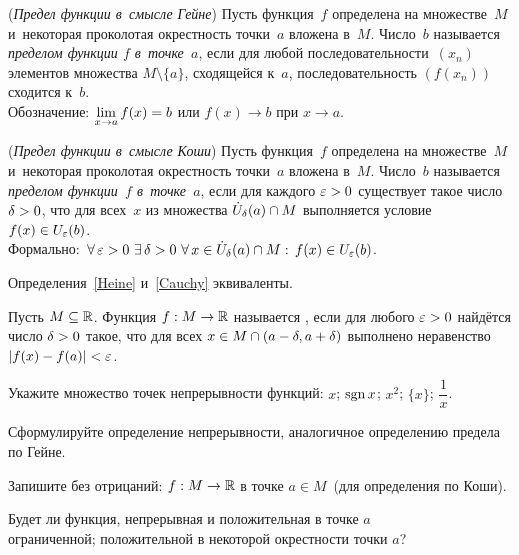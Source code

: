 \documentclass[a4paper,12pt]{article}
\newcommand{\sm}{\setminus}
\begin{document}
\label{Heine}
(\emph{Предел функции в~смысле Гейне})\; Пусть функция~$f$ определена на множестве~$M$
и~некоторая проколотая окрестность точки~$a$ вложена в~$M$.
Число~$b$ называется \emph{пределом функции $f$ в~точке~$a$}, если для любой последовательности~$(x_n)$ элементов множества $M\sm\{a\}$, сходящейся к~$a$, последовательность $(f(x_n))$ сходится к~$b$.\\
Обозначение: $\lim\limits_{x \rightarrow a}f(x) = b$ или $f(x)\to b$ при $x\to a$.

\label{Cauchy}
(\emph{Предел функции в~смысле Коши})\; Пусть функция~$f$ определена на множестве~$M$
и~некоторая проколотая окрестность точки~$a$ вложена в~$M$.
Число~$b$ называется \emph{пределом функции~$f$ в~точке~$a$}, если для каждого $\varepsilon>0$ существует такое число $\delta>0$, что для всех~$x$ из множества $\dot U_\delta(a)\cap M$ выполняется условие $f(x)\in U_\varepsilon(b)$.\\
Формально:  $\,\forall\, \varepsilon>0 \,\,\exists\, \delta>0 \,\,\forall\, x\in\dot U_\delta(a)\cap M:\,f(x)\in U_\varepsilon(b)$.

Определения~\ref{Heine} и~\ref{Cauchy} эквиваленты.


\renewcommand{\spacer}{\vspace{2mm plus 2mm minus 1.5mm}}

Пусть $M \subseteq\mathbb{R}$.
Функция $f:M\rightarrow\mathbb{R}$ называется ,
если для любого $\varepsilon > 0$ найдётся число $\delta>0$ такое,
что для всех $x\in M \cap (a-\delta, a+\delta)$ выполнено неравенство $|f(x) - f(a)| < \varepsilon$.
\vspace*{-1mm}


Укажите множество точек непрерывности функций:
$x$;
$\operatorname{sgn} x$;
$x^2$;
$\{x\}$;
$\dfrac{1}{x}$.

Сформулируйте определение непрерывности, аналогичное определению предела по Гейне.


 Запишите без отрицаний:   $f:M \rightarrow \mathbb{R}$
 в точке $a\in M$\ (для определения по Коши).

Будет ли функция, непрерывная и положительная в точке $a$\\
 ограниченной;  положительной в некоторой окрестности точки $a$?
\end{document}
